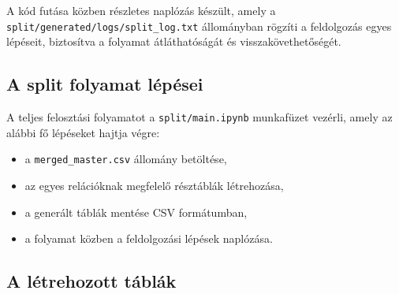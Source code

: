 A kód futása közben részletes naplózás készült, amely a \\
\texttt{split/generated/logs/split\_log.txt} állományban rögzíti a
feldolgozás egyes lépéseit, biztosítva a folyamat átláthatóságát és
visszakövethetőségét.

\subsection{A split folyamat lépései}

A teljes felosztási folyamatot a \texttt{split/main.ipynb} munkafüzet
vezérli, amely az alábbi fő lépéseket hajtja végre:
\begin{itemize}
    \item a \texttt{merged\_master.csv} állomány betöltése,
    \item az egyes relációknak megfelelő résztáblák létrehozása,
    \item a generált táblák mentése CSV formátumban,
    \item a folyamat közben a feldolgozási lépések naplózása.
\end{itemize}

\subsection{A létrehozott táblák}

